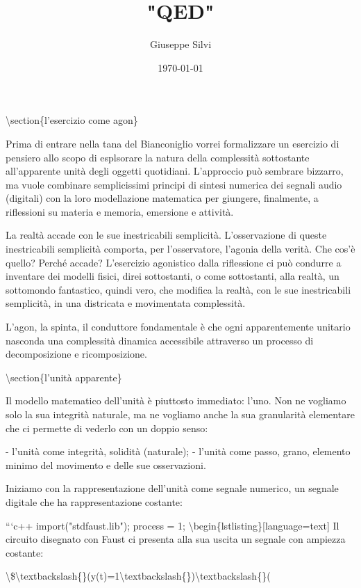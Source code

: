 \documentclass[a4paper,11pt]{article}
\title{"QED"}
\author{Giuseppe Silvi}
\date{\today}
\begin{document}
\maketitle

\textbackslash{}section\{l'esercizio come agon\}

Prima di entrare nella tana del Bianconiglio vorrei formalizzare un
esercizio di pensiero allo scopo di esplsorare la natura della
complessit\`a sottostante all'apparente unit\`a degli oggetti quotidiani.
L'approccio pu\`o sembrare bizzarro, ma vuole combinare semplicissimi
principi di sintesi numerica dei segnali audio (digitali) con la loro
modellazione matematica per giungere, finalmente, a riflessioni su
materia e memoria, emersione e attivit\`a.

La realt\`a accade con le sue inestricabili semplicit\`a. L'osservazione di
queste inestricabili semplicit\`a comporta, per l'osservatore, l'agonia
della verit\`a. Che cos'\`e quello? Perch\'e accade? L'esercizio agonistico
dalla riflessione ci pu\`o condurre a inventare dei modelli fisici, direi
sottostanti, o come sottostanti, alla realt\`a, un sottomondo fantastico,
quindi vero, che modifica la realt\`a, con le sue inestricabili semplicit\`a,
in una districata e movimentata complessit\`a.

L'agon, la spinta, il conduttore fondamentale \`e che ogni apparentemente
unitario nasconda una complessit\`a dinamica accessibile attraverso un
processo di decomposizione e ricomposizione.

\textbackslash{}section\{l'unit\`a apparente\}

Il modello matematico dell'unit\`a \`e piuttosto immediato: l'uno. Non ne
vogliamo solo la sua integrit\`a naturale, ma ne vogliamo anche la sua
granularit\`a elementare che ci permette di vederlo con un doppio senso:

 - l'unit\`a come integrit\`a, solidit\`a (naturale);
 - l'unit\`a come passo, grano, elemento minimo del movimento e delle sue
 osservazioni.

Iniziamo con la rappresentazione dell'unit\`a come segnale numerico,
un segnale digitale che ha rappresentazione costante:

```c++
import("stdfaust.lib");
process = 1;
          \textbackslash{}begin\{lstlisting\}[language=text]
Il circuito disegnato con Faust ci presenta alla sua uscita un segnale
con ampiezza costante:

\textbackslash{}\$\textbackslash{}textbackslash\{\}(y(t)=1\textbackslash{}textbackslash\{\})\textbackslash{}textbackslash\{\}(
\end{document}
